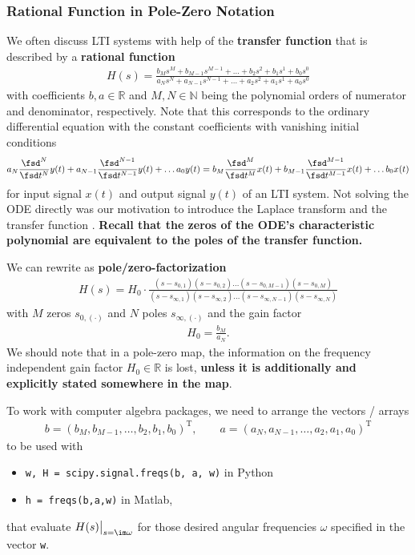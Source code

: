 \subsubsection{Rational Function in Pole-Zero Notation}
We often discuss LTI systems with help of the \textbf{transfer function} that
is described by a \textbf{rational function}
\begin{align}
\label{eq:Hs_b_a}
H(s) = \frac
{b_M s^M + b_{M-1} s^{M-1} + \dots + b_2 s^2 + b_1 s^1 + b_0 s^0}
{a_N s^N + a_{N-1} s^{N-1} + \dots + a_2 s^2 + a_1 s^1 + a_0 s^0}
\end{align}
with coefficients $b,a \in \mathbb{R}$ and $M,N \in \mathbb{N}$ being the
polynomial orders of numerator and denominator, respectively.
%
Note that this corresponds to the ordinary differential equation with the
constant coefficients with vanishing initial conditions
\begin{align}
a_N \frac{\fsd^N}{\fsd t^N}y(t) + a_{N-1} \frac{\fsd^{N-1}}{\fsd t^{N-1}}y(t) + \dots a_0 y(t)=
b_M \frac{\fsd^M}{\fsd t^M}x(t) + b_{M-1} \frac{\fsd^{M-1}}{\fsd t^{M-1}}x(t) + \dots b_0 x(t)
\end{align}
for input signal $x(t)$ and output signal $y(t)$ of an LTI system.
%
Not solving the ODE directly was our motivation to introduce the Laplace transform
and the transfer function .
\textbf{Recall that the zeros of the ODE's characteristic polynomial are equivalent to
the poles of the transfer function.}
%

We can rewrite  as \textbf{pole/zero-factorization}
\begin{align}
\label{eq:Hs_H0_z_p}
H(s) = H_0 \cdot \frac
{(s-s_{0,1}) (s-s_{0,2}) \dots (s-s_{0,M-1}) (s-s_{0,M})}
{(s-s_{\infty,1}) (s-s_{\infty,2}) \dots (s-s_{\infty,N-1}) (s-s_{\infty,N})}
\end{align}
with $M$ zeros $s_{0,(\cdot)}$ and $N$ poles $s_{\infty,(\cdot)}$
and the gain factor
\begin{align}
H_0 = \frac{b_M}{a_N}.
\end{align}
%
We should note that in a pole-zero map, the information on the frequency
independent gain factor $H_0 \in \mathbb{R}$ is lost, \textbf{unless it is
additionally and explicitly stated somewhere in the map}.

To work with computer algebra packages, we need to arrange the vectors / arrays
\begin{align}
b = (b_M, b_{M-1}, \dots, b_2, b_1, b_0)^\mathrm{T}, \qquad
a = (a_N, a_{N-1}, \dots, a_2, a_1, a_0)^\mathrm{T}
\end{align}
to be used with
\begin{itemize}
  \item \verb|w, H = scipy.signal.freqs(b, a, w)| in Python
  \item \verb|h = freqs(b,a,w)| in Matlab,
\end{itemize}
that evaluate $H(s)\big|_{s=\im\omega}$ for
those desired angular frequencies $\omega$ specified in the vector \verb|w|.



